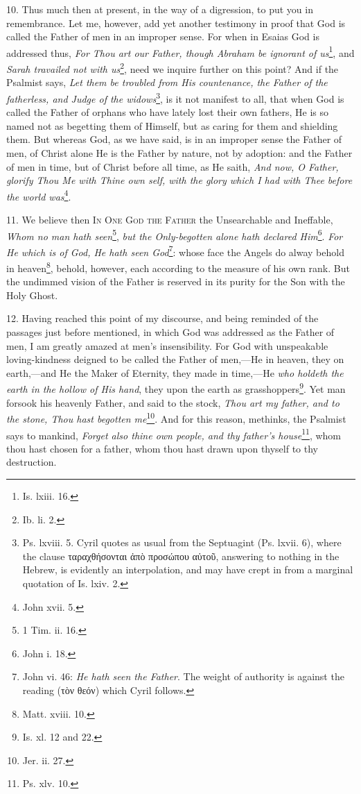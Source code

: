 10. Thus much then at present, in the way of a digression, to put you in remembrance. Let me, however, add yet another testimony in proof that God is called the Father of men in an improper sense. For when in Esaias God is addressed thus, \emph{For Thou art our Father, though Abraham be ignorant of us}\footnote{Is. lxiii. 16.}, and \emph{Sarah travailed not with us}\footnote{Ib. li. 2.}, need we inquire further on this point? And if the Psalmist says, \emph{Let them be troubled from His countenance, the Father of the fatherless, and Judge of the widows}\footnote{Ps. lxviii. 5. Cyril quotes as usual from the Septuagint (Ps. lxvii. 6), where the clause \textgreek{ταραχθήσονται ἀπὸ προσώπου αὐτοῦ}, answering to nothing in the Hebrew, is evidently an interpolation, and may have crept in from a marginal quotation of Is. lxiv. 2.}, is it not manifest to all, that when God is called the Father of orphans who have lately lost their own fathers, He is so named not as begetting them of Himself, but as caring for them and shielding them. But whereas God, as we have said, is in an improper sense the Father of men, of Christ alone He is the Father by nature, not by adoption: and the Father of men in time, but of Christ before all time, as He saith, \emph{And now, O Father, glorify Thou Me with Thine own self, with the glory which I had with Thee before the world was}\footnote{John xvii. 5.}.

11. We believe then \textsc{In One God the Father} the Unsearchable and Ineffable, \emph{Whom no man hath seen}\footnote{1 Tim. ii. 16.}, \emph{but the Only-begotten alone hath declared Him}\footnote{John i. 18.}. \emph{For He which is of God, He hath seen God}\footnote{John vi. 46: \emph{He hath seen the Father}. The weight of authority is against the reading (\textgreek{τὸν θεόν}) which Cyril follows.}: whose face the Angels do alway behold in heaven\footnote{Matt. xviii. 10.}, behold, however, each according to the measure of his own rank. But the undimmed vision of the Father is reserved in its purity for the Son with the Holy Ghost.

12. Having reached this point of my discourse, and being reminded of the passages just before mentioned, in which God was addressed as the Father of men, I am greatly amazed at men’s insensibility. For God with unspeakable loving-kindness deigned to be called the Father of men,—He in heaven, they on earth,—and He the Maker of Eternity, they made in time,—He \emph{who holdeth the earth in the hollow of His hand}, they upon the earth as grasshoppers\footnote{Is. xl. 12 and 22.}. Yet man forsook his heavenly Father, and said to the stock, \emph{Thou art my father, and to the stone, Thou hast begotten me}\footnote{Jer. ii. 27.}. And for this reason, methinks, the Psalmist says to mankind, \emph{Forget also thine own people, and thy father’s house}\footnote{Ps. xlv. 10.}, whom thou hast chosen for a father, whom thou hast drawn upon thyself to thy destruction.

